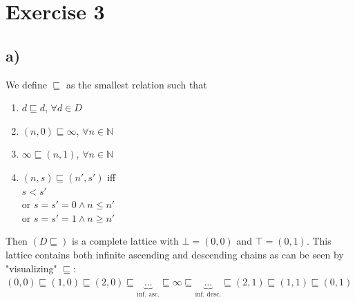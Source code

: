\documentclass[fleqn,12pt]{article}
\begin{document}
\section*{Exercise 3}
\subsection*{a)}
We define $\sqsubseteq$ as the smallest relation such that\\
\begin{enumerate}
\item $d \sqsubseteq d$, $\forall d \in D$
\item $(n,0) \sqsubseteq \infty$, $\forall n \in \mathbb{N}$
\item $\infty \sqsubseteq (n,1)$, $\forall n \in \mathbb{N}$
\item $(n,s) \sqsubseteq (n',s')$ iff \\ 
	$s < s'$\\
	or $s=s'=0 \wedge n \leq n'$\\
	or $s=s'=1 \wedge n \geq n'$	
\end{enumerate}
Then $(D\sqsubseteq)$ is a complete lattice with $\bot=(0,0)$ and $\top=(0,1)$.
This lattice contains both infinite ascending and descending chains as can be seen by "visualizing" $\sqsubseteq$:\\
$(0,0)\sqsubseteq(1,0)\sqsubseteq(2,0)\sqsubseteq \underbrace{\dots}_\text{inf. asc.} \sqsubseteq\infty\sqsubseteq \underbrace{\dots}_\text{inf. desc.} \sqsubseteq (2,1) \sqsubseteq (1,1) \sqsubseteq (0,1)$
\newpage
\end{document}
